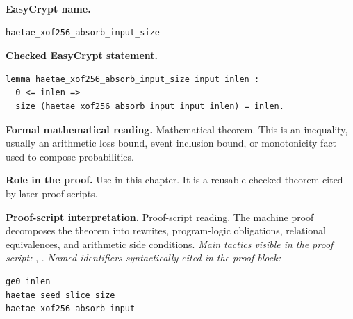 \begin{formaltheorem}
\noindent\textbf{EasyCrypt name.}
\begin{lstlisting}[language=EasyCrypt,basicstyle=\ttfamily\scriptsize]
haetae_xof256_absorb_input_size
\end{lstlisting}
\noindent\textbf{Checked EasyCrypt statement.}
\begin{lstlisting}[language=EasyCrypt,basicstyle=\ttfamily\scriptsize]
lemma haetae_xof256_absorb_input_size input inlen :
  0 <= inlen =>
  size (haetae_xof256_absorb_input input inlen) = inlen.
\end{lstlisting}
\noindent\textbf{Formal mathematical reading.}
Mathematical theorem. This is an inequality, usually an arithmetic loss bound, event inclusion bound, or monotonicity fact used to compose probabilities.

\noindent\textbf{Role in the proof.}
Use in this chapter. It is a reusable checked theorem cited by later proof scripts.

\noindent\textbf{Proof-script interpretation.}
Proof-script reading. The machine proof decomposes the theorem into rewrites, program-logic obligations, relational equivalences, and arithmetic side conditions.
\emph{Main tactics visible in the proof script:} , .
\emph{Named identifiers syntactically cited in the proof block:}
\begin{lstlisting}[language=EasyCrypt,basicstyle=\ttfamily\scriptsize]
ge0_inlen
haetae_seed_slice_size
haetae_xof256_absorb_input
\end{lstlisting}

\end{formaltheorem}

